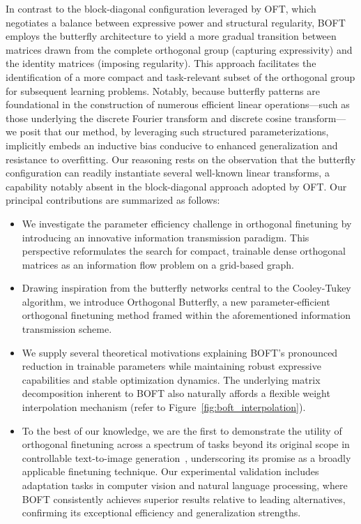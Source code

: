 In contrast to the block-diagonal configuration leveraged by OFT, which negotiates a balance between expressive power and structural regularity, BOFT employs the butterfly architecture to yield a more gradual transition between matrices drawn from the complete orthogonal group (capturing expressivity) and the identity matrices (imposing regularity). This approach facilitates the identification of a more compact and task-relevant subset of the orthogonal group for subsequent learning problems. Notably, because butterfly patterns are foundational in the construction of numerous efficient linear operations—such as those underlying the discrete Fourier transform and discrete cosine transform—we posit that our method, by leveraging such structured parameterizations, implicitly embeds an inductive bias conducive to enhanced generalization and resistance to overfitting. Our reasoning rests on the observation that the butterfly configuration can readily instantiate several well-known linear transforms, a capability notably absent in the block-diagonal approach adopted by OFT. Our principal contributions are summarized as follows:

\begin{itemize}[leftmargin=*,nosep]
    \item We investigate the parameter efficiency challenge in orthogonal finetuning by introducing an innovative information transmission paradigm. This perspective reformulates the search for compact, trainable dense orthogonal matrices as an information flow problem on a grid-based graph.
    \item Drawing inspiration from the butterfly networks central to the Cooley-Tukey algorithm, we introduce Orthogonal Butterfly, a new parameter-efficient orthogonal finetuning method framed within the aforementioned information transmission scheme.
    \item We supply several theoretical motivations explaining BOFT's pronounced reduction in trainable parameters while maintaining robust expressive capabilities and stable optimization dynamics. The underlying matrix decomposition inherent to BOFT also naturally affords a flexible weight interpolation mechanism (refer to Figure~\ref{fig:boft_interpolation}).
    \item To the best of our knowledge, we are the first to demonstrate the utility of orthogonal finetuning across a spectrum of tasks beyond its original scope in controllable text-to-image generation~\cite{qiu2023controlling}, underscoring its promise as a broadly applicable finetuning technique. Our experimental validation includes adaptation tasks in computer vision and natural language processing, where BOFT consistently achieves superior results relative to leading alternatives, confirming its exceptional efficiency and generalization strengths.
\end{itemize}

